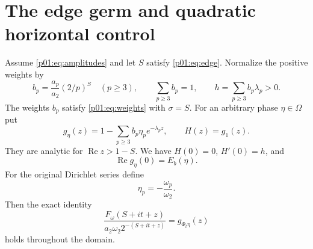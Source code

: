 \documentclass[11pt,letterpaper]{article}
\theoremstyle{definition}
\theoremstyle{remark}
\newcommand{\Ree}{\operatorname{Re}}
\newcommand{\1}{\mathbf 1}
\begin{document}
\section{The edge germ and quadratic horizontal control}

Assume \eqref{p01:eq:amplitudes} and let $S$ satisfy \eqref{p01:eq:edge}.
Normalize the positive weights by
\begin{equation}\label{p01:eq:bweights}
 b_p=\frac{a_p}{a_2}(2/p)^S\quad(p\ge3),\qquad
 \sum_{p\ge3}b_p=1,\qquad
 h=\sum_{p\ge3}b_p\lambda_p>0.
\end{equation}
The weights $b_p$ satisfy \eqref{p01:eq:weights} with $\sigma=S$.
For an arbitrary phase $\eta\in\Omega$ put
\begin{equation}\label{p01:eq:germ}
 g_\eta(z)=1-\sum_{p\ge3}b_p\eta_pe^{-\lambda_p z},\qquad
 H(z)=g_1(z).
\end{equation}
They are analytic for $\Ree z>1-S$. We have
$H(0)=0$, $H'(0)=h$, and
\begin{equation}\label{p01:eq:realenergy}
 \Ree g_\eta(0)=E_b(\eta).
\end{equation}
For the original Dirichlet series define
\begin{equation}\label{p01:eq:phasequotient}
 \eta_p=-\frac{\omega_p}{\omega_2}.
\end{equation}
Then the exact identity
\begin{equation}\label{p01:eq:normalizedF}
 \frac{F_\omega(S+it+z)}
      {a_2\omega_2 2^{-(S+it+z)}}=g_{\Phi_t\eta}(z)
\end{equation}
holds throughout the domain.
\end{document}

